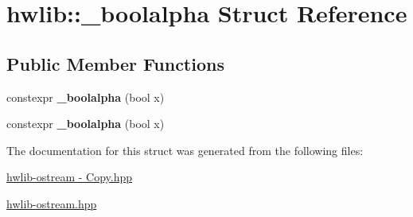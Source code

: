 \hypertarget{structhwlib_1_1__boolalpha}{}\section{hwlib\+:\+:\+\_\+boolalpha Struct Reference}
\label{structhwlib_1_1__boolalpha}
\subsection*{Public Member Functions}
\begin{DoxyCompactItemize}
\item 
constexpr {\bfseries \+\_\+boolalpha} (bool x)\hypertarget{structhwlib_1_1__boolalpha_a9972ce841479f54863b82332f82ed732}{}\label{structhwlib_1_1__boolalpha_a9972ce841479f54863b82332f82ed732}

\item 
constexpr {\bfseries \+\_\+boolalpha} (bool x)\hypertarget{structhwlib_1_1__boolalpha_a9972ce841479f54863b82332f82ed732}{}\label{structhwlib_1_1__boolalpha_a9972ce841479f54863b82332f82ed732}

\end{DoxyCompactItemize}


The documentation for this struct was generated from the following files\+:\begin{DoxyCompactItemize}
\item 
\hyperlink{hwlib-ostream_01-_01_copy_8hpp}{hwlib-\/ostream -\/ Copy.\+hpp}\item 
\hyperlink{hwlib-ostream_8hpp}{hwlib-\/ostream.\+hpp}\end{DoxyCompactItemize}
